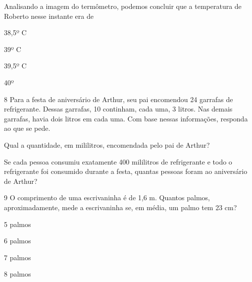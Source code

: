Analisando a imagem do termômetro, podemos concluir que a temperatura de Roberto nesse instante era de

\begin{minipage}{.5\textwidth}
\begin{escolha}

\item
  38,5º C
\item
  39º C
\item
  39,5º C
\item
  40º
\end{escolha}
\end{minipage}

\num{8} Para a festa de aniversário de Arthur, seu pai encomendou 24 garrafas de
refrigerante. Dessas garrafas, 10 continham, cada uma, 3 litros. Nas
demais garrafas, havia dois litros em cada uma. Com base nessas
informações, responda ao que se pede.

\begin{escolha}
\item Qual a quantidade, em mililitros, encomendada pelo pai de Arthur?


\item Se cada pessoa consumiu exatamente 400 mililitros de refrigerante e
  todo o refrigerante foi consumido durante a festa, quantas pessoas
  foram ao aniversário de Arthur?

\end{escolha}

\num{9} O comprimento de uma escrivaninha é de 1,6 m. Quantos palmos,
aproximadamente, mede a escrivaninha se, em média, um palmo tem 23 cm?

\begin{minipage}{.5\textwidth}
\begin{escolha}
\item
  5 palmos
\item
  6 palmos
\item
  7 palmos
\item
  8 palmos
\end{escolha}
\end{minipage}


